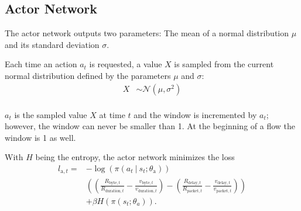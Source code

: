 \documentclass[sigconf]{acmart}
\newcommand\givenbase[1][]{\:#1\lvert\:}
\let\given\givenbase
\begin{document}
\subsection{Actor Network}
\label{subsec:actor}

The actor network outputs two parameters: The mean of a normal distribution $\mu$ and its standard deviation $\sigma$. 

Each time an action $a_t$ is requested, a value $X$ is sampled from the current normal distribution defined by the parameters $\mu$ and $\sigma$: 
\begin{align*}
X&\sim {\mathcal {N}}(\mu ,\sigma^{2})\\
\end{align*}

$a_t$ is the sampled value $X$ at time $t$ and the window is incremented by $a_t$; however, the window can never be smaller than 1. At the beginning of a flow the window is 1 as well.

With $H$ being the entropy, the actor network minimizes the loss
\begin{align*}
l_{\text{a},t} =& -\log \left( \pi \left( a_t \given s_t ; \theta_\text{a} \right) \right)\\
&\left( \left(\frac{R_{\text{byte},t}}{{R_{\text{duration},t}}} - \frac{v_{\text{byte},t}}{{v_{\text{duration},t}}}\right) - \left( \frac{R_{\text{delay},t}}{{R_{\text{packet},t}}}- \frac{v_{\text{delay},t}}{{v_{\text{packet},t}}} \right)\right)\\ 
&+ \beta H\left( \pi\left( s_t; \theta_a \right)\right).
\end{align*}
 


\end{document}

